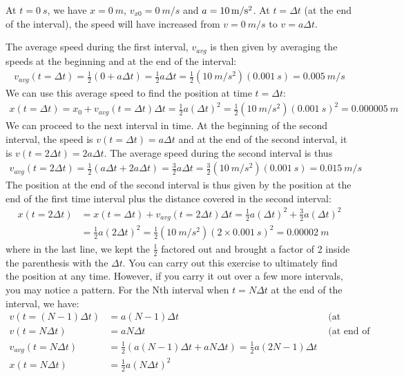 At $t=\SI{0}{s}$, we have $x=\SI{0}{m}$, $v_{x0}=\SI{0}{m\per s}$ and $a=\SI{10}{m \per s\squared}$. At $t=\Delta t$ (at the end of the interval), the speed will have increased from $v=\SI{0}{m\per s}$ to $v=a\Delta t$.

The average speed during the first interval, $v_{avg}$ is then given by averaging the speeds at the beginning and at the end of the interval:
\begin{align*}
v_{avg}(t=\Delta t)=\frac{1}{2}(0 + a\Delta t)=\frac{1}{2}a\Delta t=\frac{1}{2}(\SI{10}{m/s^2})(\SI{0.001}{s})=\SI{0.005}{m/s}
\end{align*}
 We can use this average speed to find the position at time $t=\Delta t$:
\begin{align*}
x(t=\Delta t) = x_0 +v_{avg}(t=\Delta t)\Delta t = \frac{1}{2}a(\Delta t)^2=\frac{1}{2}(\SI{10}{m/s^2})(\SI{0.001}{s})^2=\SI{0.000005}{m}
\end{align*}
We can proceed to the next interval in time. At the beginning of the second interval, the speed is $v(t=\Delta t)=a\Delta t$ and at the end of the second interval, it is $v(t=2\Delta t)=2a\Delta t$. The average speed during the second interval is thus
\begin{align*}
v_{avg}(t=2\Delta t)=\frac{1}{2}(a\Delta t+2a\Delta t)=\frac{3}{2}a\Delta t=\frac{3}{2}(\SI{10}{m/s^2})(\SI{0.001}{s})=\SI{0.015}{m/s}
\end{align*}
The position at the end of the second interval is thus given by the position at the end of the first time interval plus the distance covered in the second interval:
\begin{align*}
x(t=2\Delta t) &= x(t=\Delta t) +v_{avg}(t=2\Delta t)\Delta t = \frac{1}{2}a(\Delta t)^2+\frac{3}{2}a(\Delta t)^2\\
               &=\frac{1}{2}a(2\Delta t)^2=\frac{1}{2}(\SI{10}{m/s^2})(2\times\SI{0.001}{s})^2=\SI{0.00002}{m}
\end{align*}
where in the last line, we kept the $\frac{1}{2}$ factored out and brought a factor of 2 inside the parenthesis with the $\Delta t$. You can carry out this exercise to ultimately find the position at any time. However, if you carry it out over a few more intervals, you may notice a pattern. For the Nth interval when $t=N\Delta t$ at the end of the interval, we have:
\begin{align*}
v(t=(N-1)\Delta t) &= a (N-1) \Delta t &\text{	(at beginning of interval N)}\\
v(t=N\Delta t) &= a N \Delta t &\text{	(at end of interval N)}\\
v_{avg}(t=N\Delta t)&=\frac{1}{2} (a (N-1) \Delta t + a N \Delta t)=\frac{1}{2}a(2N-1)\Delta t&\\
x(t=N\Delta t)&=\frac{1}{2}a(N\Delta t)^2&
\end{align*}

